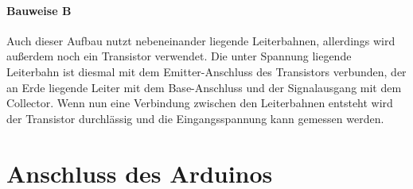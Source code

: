 \documentclass{report}
\begin{document}
\subsubsection{Bauweise B}
Auch dieser Aufbau nutzt nebeneinander liegende Leiterbahnen, allerdings wird außerdem noch ein Transistor verwendet. Die unter Spannung liegende Leiterbahn ist diesmal mit dem Emitter-Anschluss des Transistors verbunden, der an Erde liegende Leiter mit dem Base-Anschluss und der Signalausgang mit dem Collector. Wenn nun eine Verbindung zwischen den Leiterbahnen entsteht wird der Transistor durchlässig und die Eingangsspannung kann gemessen werden.

\chapter{Anschluss des Arduinos}
\end{document}
